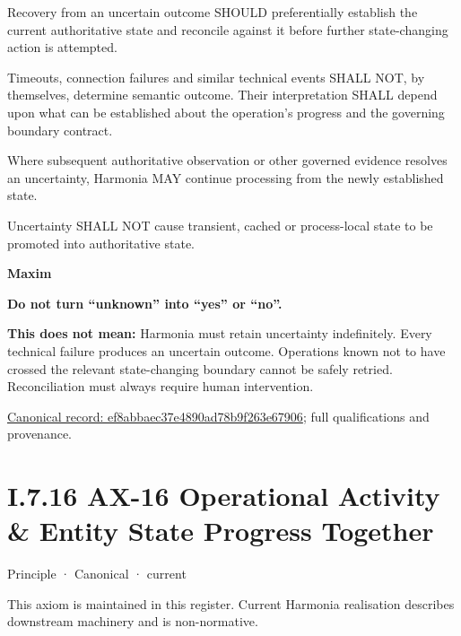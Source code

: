 Recovery from an uncertain outcome SHOULD preferentially establish the current authoritative state and reconcile against it before further state-changing action is attempted.



Timeouts, connection failures and similar technical events SHALL NOT, by themselves, determine semantic outcome. Their interpretation SHALL depend upon what can be established about the operation's progress and the governing boundary contract.



Where subsequent authoritative observation or other governed evidence resolves an uncertainty, Harmonia MAY continue processing from the newly established state.



Uncertainty SHALL NOT cause transient, cached or process-local state to be promoted into authoritative state.



\par\medskip\textbf{Maxim}\par


\textbf{Do not turn “unknown” into “yes” or “no”.}



\textbf{This does not mean:} Harmonia must retain uncertainty indefinitely. Every technical failure produces an uncertain outcome. Operations known not to have crossed the relevant state-changing boundary cannot be safely retried. Reconciliation must always require human intervention.


{\footnotesize \href{../../../../continuum/motivation/principle/ef8abbaec37e4890ad78b9f263e67906.md}{Canonical record: ef8abbaec37e4890ad78b9f263e67906}; full qualifications and provenance.}\par
\section*{I.7.16 AX-16 Operational Activity \& Entity State Progress Together}
\label{navigation:I.7.16}

\label{element:de7e90f46127455a9ec9ad3b9b48ba54}
{\small Principle · Canonical · current}\par

This axiom is maintained in this register. Current Harmonia realisation describes downstream machinery and is non-normative.



